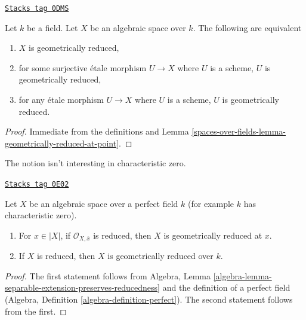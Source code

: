 \begin{lemma}
\label{spaces-over-fields-lemma-geometrically-reduced}
\href{https://stacks.math.columbia.edu/tag/0DMS}{\texttt{Stacks tag 0DMS}}

Let $k$ be a field. Let $X$ be an algebraic space over $k$.
The following are equivalent
\begin{enumerate}
\item $X$ is geometrically reduced,
\item for some surjective \'etale morphism $U \to X$ where $U$
is a scheme, $U$ is geometrically reduced,
\item for any \'etale morphism $U \to X$
where $U$ is a scheme, $U$ is geometrically reduced.
\end{enumerate}
\end{lemma}

\begin{proof}
Immediate from the definitions and
Lemma \ref{spaces-over-fields-lemma-geometrically-reduced-at-point}.
\end{proof}

The notion isn't interesting in characteristic zero.

\begin{lemma}
\label{spaces-over-fields-lemma-perfect-reduced}
\href{https://stacks.math.columbia.edu/tag/0E02}{\texttt{Stacks tag 0E02}}

Let $X$ be an algebraic space over a perfect field $k$ (for example
$k$ has characteristic zero).
\begin{enumerate}
\item For $x \in |X|$, if $\mathcal{O}_{X, \overline{x}}$ is
reduced, then $X$ is geometrically reduced at $x$.
\item If $X$ is reduced, then $X$ is geometrically reduced over $k$.
\end{enumerate}
\end{lemma}

\begin{proof}
The first statement follows from
Algebra, Lemma \ref{algebra-lemma-separable-extension-preserves-reducedness}
and the definition of a perfect field
(Algebra, Definition \ref{algebra-definition-perfect}).
The second statement follows from the first.
\end{proof}

